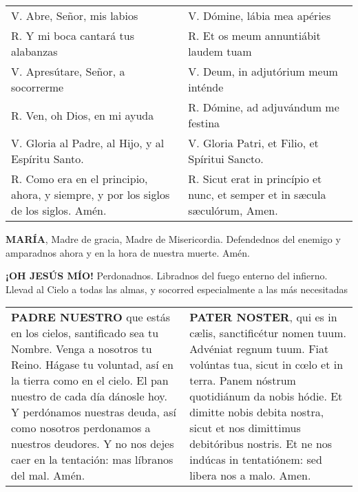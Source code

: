 \documentclass[./rosary.tex]{subfiles}
\begin{document}
\begin{longtable} {p{} p{} }
    V. Abre, Señor, mis labios                                                           & V. Dómine, lábia mea apéries                                                \\
    R. Y mi boca cantará tus alabanzas                                                   & R. Et os meum annuntiábit laudem tuam                                       \\
    V. Apresútare, Señor, a socorrerme                                                   & V. Deum, in adjutórium meum inténde                                         \\
    R. Ven, oh Dios, en mi ayuda                                                         & R. Dómine, ad adjuvándum me festina                                         \\
    V. Gloria al Padre, al Hijo, y al Espíritu Santo.\label{sec:glory}                   & V. Gloria Patri, et Filio, et Spíritui Sancto.                              \\
    R. Como era en el principio, ahora, y siempre, y por los siglos de los siglos. Amén. & R. Sicut erat in princípio et nunc, et semper et in sæcula sæculórum, Amen.
\end{longtable}

\begin{center}
    \label{endTenPrayers}
    \textbf{MARÍA}, Madre de gracia, Madre de Misericordia. Defendednos del enemigo y amparadnos ahora y en la hora de nuestra muerte. Amén.

    \textbf{¡OH JESÚS MÍO!} Perdonadnos. Libradnos del fuego enterno del infierno. Llevad al Cielo a todas las almas, y socorred especialmente
    a las más necesitadas
\end{center}

\label{sec:ourFather}
\begin{longtable} { p{} p{} }
    \textbf{PADRE NUESTRO} que estás en los cielos, santificado sea tu Nombre. Venga a nosotros tu Reino.
    Hágase tu voluntad, así en la tierra como en el cielo. El pan nuestro de cada día dánosle hoy.
    Y perdónamos nuestras deuda, así como nosotros perdonamos a nuestros deudores.
    Y no nos dejes caer en la tentación: mas líbranos del mal. Amén.

     &

    \textbf{PATER NOSTER}, qui es in cælis, sanctificétur nomen tuum. Advéniat regnum tuum.
    Fiat volúntas tua, sicut in cœlo et in terra. Panem nóstrum quotidiánum da nobis hódie.
    Et dimitte nobis debita nostra, sicut et nos dimittimus debitóribus nostris.
    Et ne nos indúcas in tentatiónem: sed libera nos a malo. Amen.
\end{longtable}
\end{document}
